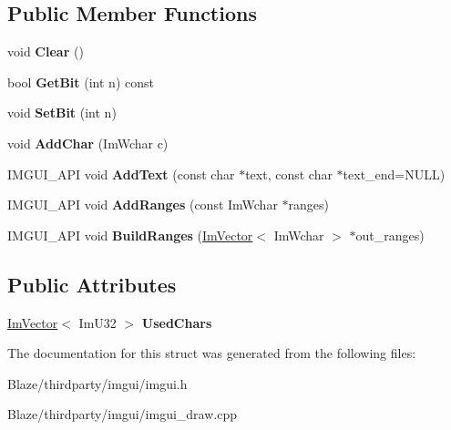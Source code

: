 \subsection*{Public Member Functions}
\begin{DoxyCompactItemize}
\item 
\mbox{\label{structImFontGlyphRangesBuilder_a918c20b2291c13acd86b5fbbf6097b7f}} 
void {\bfseries Clear} ()
\item 
\mbox{\label{structImFontGlyphRangesBuilder_a6143564d6b8399ca4e1dfc17e688114e}} 
bool {\bfseries Get\+Bit} (int n) const
\item 
\mbox{\label{structImFontGlyphRangesBuilder_a36c59006df968d10c8d2b24b8011ec81}} 
void {\bfseries Set\+Bit} (int n)
\item 
\mbox{\label{structImFontGlyphRangesBuilder_a6d3f5e3e377a73f4f4324c4cf98600dd}} 
void {\bfseries Add\+Char} (Im\+Wchar c)
\item 
\mbox{\label{structImFontGlyphRangesBuilder_ade9770bde0f63b4630df30402f3619cf}} 
I\+M\+G\+U\+I\+\_\+\+A\+PI void {\bfseries Add\+Text} (const char $\ast$text, const char $\ast$text\+\_\+end=N\+U\+LL)
\item 
\mbox{\label{structImFontGlyphRangesBuilder_ac28bc574d4d34d3a2889cda34470ae71}} 
I\+M\+G\+U\+I\+\_\+\+A\+PI void {\bfseries Add\+Ranges} (const Im\+Wchar $\ast$ranges)
\item 
\mbox{\label{structImFontGlyphRangesBuilder_abc11a683e1b345299c42abd8b6c422a5}} 
I\+M\+G\+U\+I\+\_\+\+A\+PI void {\bfseries Build\+Ranges} (\hyperlink{structImVector}{Im\+Vector}$<$ Im\+Wchar $>$ $\ast$out\+\_\+ranges)
\end{DoxyCompactItemize}
\subsection*{Public Attributes}
\begin{DoxyCompactItemize}
\item 
\mbox{\label{structImFontGlyphRangesBuilder_af83d63600e78e2454a78f0d736ba8ee4}} 
\hyperlink{structImVector}{Im\+Vector}$<$ Im\+U32 $>$ {\bfseries Used\+Chars}
\end{DoxyCompactItemize}


The documentation for this struct was generated from the following files\+:\begin{DoxyCompactItemize}
\item 
Blaze/thirdparty/imgui/imgui.\+h\item 
Blaze/thirdparty/imgui/imgui\+\_\+draw.\+cpp\end{DoxyCompactItemize}
